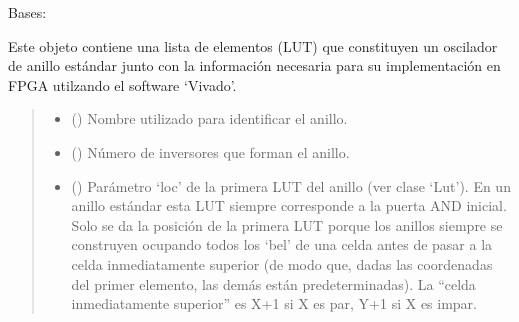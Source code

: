 \documentclass[letterpaper,10pt,english]{sphinxmanual}
\begin{document}
\begin{fulllineitems}
\label{\detokenize{fpga.ring_osc:fpga.ring_osc.StdRing}}
\pysigstartsignatures
{}
\pysigstopsignatures
\sphinxAtStartPar
Bases: 

\sphinxAtStartPar
Este objeto contiene una lista de elementos (LUT) que constituyen un oscilador de anillo estándar junto con la información necesaria para su implementación en FPGA utilzando el software ‘Vivado’.
\begin{quote}\begin{description}
\begin{itemize}
\item {} 
\sphinxAtStartPar
{} () \textendash{} Nombre utilizado para identificar el anillo.

\item {} 
\sphinxAtStartPar
{} () \textendash{} Número de inversores que forman el anillo.

\item {} 
\sphinxAtStartPar
{} () \textendash{} Parámetro ‘loc’ de la primera LUT del anillo (ver clase ‘Lut’). En un anillo estándar esta LUT siempre corresponde a la puerta AND inicial. Solo se da la posición de la primera LUT porque los anillos siempre se construyen ocupando todos los ‘bel’ de una celda antes de pasar a la celda inmediatamente superior (de modo que, dadas las coordenadas del primer elemento, las demás están predeterminadas). La “celda inmediatamente superior” es X+1 si X es par, Y+1 si X es impar.


\end{itemize}
\end{description}
\end{quote}
\end{fulllineitems}
\end{document}
